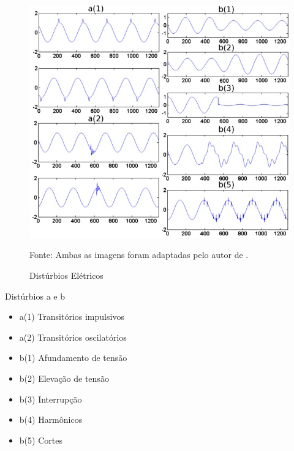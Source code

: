 \begin{figure}[hbt]
\begin{center}
\caption{Distúrbios Elétricos}
\includegraphics[width=12cm]{imagens/Imagema-final-AB2.jpg}
\par{\small Fonte: Ambas as imagens foram adaptadas pelo autor de \cite{FER10}.}
\label{fig:tiposperturbações}
\end{center}
\end{figure}

\par Distúrbios a e b
\begin{itemize}
\item a(1) Transitórios impulsivos
\item a(2) Transitórios oscilatórios
\item b(1) Afundamento de tensão
\item b(2) Elevação de tensão
\item b(3) Interrupção
\item b(4) Harmônicos 
\item b(5) Cortes
\end{itemize}

